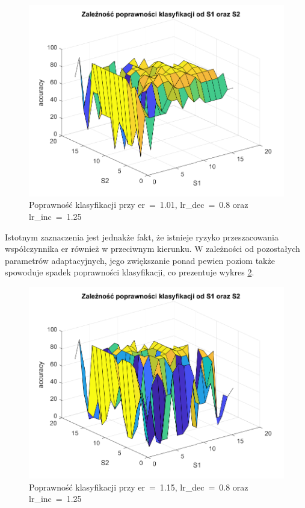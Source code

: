 \documentclass[12pt,twoside]{article}
\begin{document}
\begin{figure}[ht]
	\centering
	\includegraphics[width=16cm]{figures/ErS1S2_2.png}
	\caption{Poprawność klasyfikacji przy er~=~1.01, lr\_dec~=~0.8 oraz lr\_inc~=~1.25}
	\label{Fig:ErS1S22}
\end{figure}

Istotnym zaznaczenia jest jednakże fakt, że istnieje ryzyko przeszacowania współczynnika er również  w przeciwnym kierunku.
W zależności od pozostałych parametrów adaptacyjnych, jego zwiększanie ponad pewien poziom także spowoduje spadek poprawności klasyfikacji, co prezentuje wykres \ref{Fig:ErS1S23}.
\begin{figure}[ht]
	\centering
	\includegraphics[width=16cm]{figures/ErS1S2_3.png}
	\caption{Poprawność klasyfikacji przy er~=~1.15, lr\_dec~=~0.8 oraz lr\_inc~=~1.25}
	\label{Fig:ErS1S23}
\end{figure}
\end{document}
